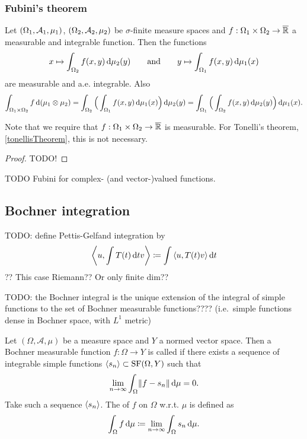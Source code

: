 \subsubsection{Fubini's theorem}
\begin{theorem}
Let $\sSet{\Omega_1, \mathcal{A}_1, \mu_1}$, $\sSet{\Omega_2, \mathcal{A}_2, \mu_2}$ be $\sigma$-finite measure spaces and $f: \Omega_1\times\Omega_2 \to \overline{\mathbb{R}}$ a measurable and integrable function. Then the functions
\[ x\mapsto \int_{\Omega_2}f(x,y)\operatorname{d \!}{\mu_2(y)} \qquad\text{and}\qquad y\mapsto \int_{\Omega_1}f(x,y)\operatorname{d \!}{\mu_1(x)} \]
are measurable and a.e. integrable. Also
\[ \int_{\Omega_1\times\Omega_2}f\operatorname{d \!}{(\mu_1\otimes\mu_2)} = \int_{\Omega_2}\Big(\int_{\Omega_1}f(x,y)\operatorname{d \!}{\mu_1(x)}\Big)\operatorname{d \!}{\mu_2(y)} = \int_{\Omega_1}\Big(\int_{\Omega_2}f(x,y)\operatorname{d \!}{\mu_2(y)}\Big)\operatorname{d \!}{\mu_1(x)}. \]
\end{theorem}
Note that we require that $f: \Omega_1\times\Omega_2 \to \overline{\mathbb{R}}$ is measurable. For Tonelli's theorem, \ref{tonellisTheorem}, this is not necessary.
\begin{proof}
TODO!
\end{proof}

TODO Fubini for complex- (and vector-)valued functions.

\subsection{Bochner integration}
TODO: define Pettis-Gelfand integration by
\[ \inner{u, \int T(t)\diff{t} v} \defeq \int\inner{u,T(t)v}\diff{t} \]
??
This case Riemann?? Or only finite dim??



TODO: the Bochner integral is the unique extension of the integral of simple functions to the set of Bochner measurable functions???? (i.e.\ simple functions dense in Bochner space, with $L^1$ metric)
\begin{definition}
Let $(\Omega, \mathcal{A},\mu)$ be a measure space and $Y$ a normed vector space. Then a Bochner measurable function $f:\Omega\to Y$ is called  if there exists a sequence of integrable simple functions $\left\langle s_n \right\rangle\subset\operatorname{SF}(\Omega,Y)$ such that
\[ \lim_{n\to\infty}\int_\Omega \lVert f-s_n\rVert\operatorname{d \!}{\mu} = 0. \]
Take such a sequence $\left\langle s_n \right\rangle$. The  of $f$ on $\Omega$ w.r.t. $\mu$ is defined as
\[ \int_\Omega f\operatorname{d \!}{\mu} \coloneqq \lim_{n\to\infty}\int_\Omega s_n\operatorname{d \!}{\mu}. \]
\end{definition}

